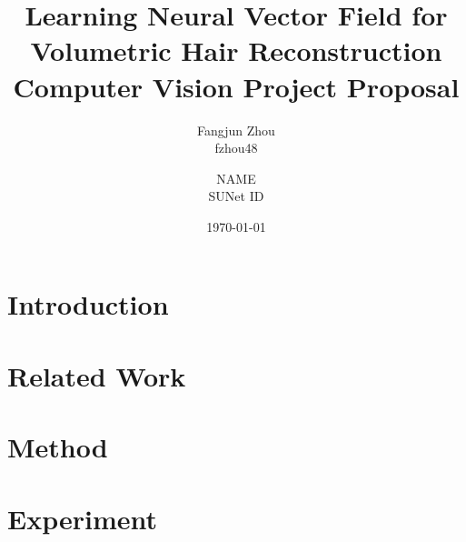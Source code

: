 \documentclass[12pt]{article}
\title{
  Learning Neural Vector Field for Volumetric Hair Reconstruction \\
  {
    \small
    Computer Vision Project Proposal
  }
}
\author{
  Fangjun Zhou \\ fzhou48
  \and NAME \\ SUNet ID
}
\date{\today}
\begin{document}
  \maketitle

  \section{Introduction}

  \section{Related Work}

  \section{Method}

  \section{Experiment}
\end{document}

